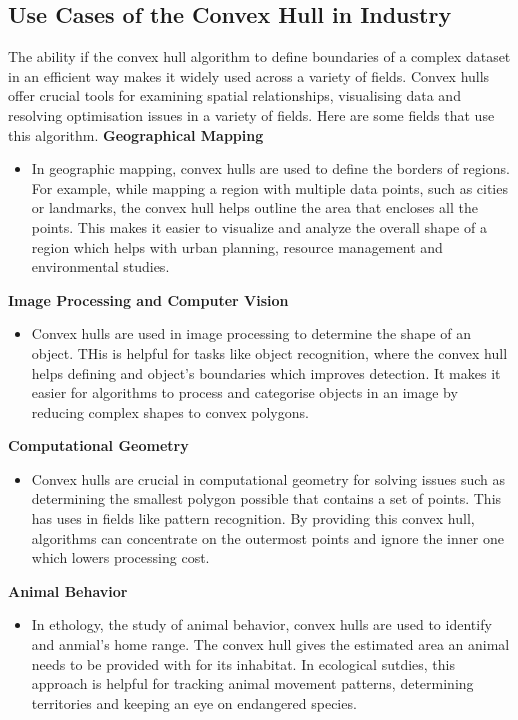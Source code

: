     \subsection{Use Cases of the Convex Hull in Industry}
    The ability if the convex hull algorithm to define boundaries of a complex dataset in an efficient way makes it widely used across a variety of fields. Convex hulls offer crucial tools for examining spatial relationships, visualising data and resolving optimisation issues in a variety of fields. Here are some fields that use this algorithm. \newline \newline
    \textbf{Geographical Mapping}
    \begin{itemize}
        \item In geographic mapping, convex hulls are used to define the borders of regions. For example, while mapping a region with multiple data points, such as cities or landmarks, the convex hull helps outline the area that encloses all the points. This makes it easier to visualize and analyze the overall shape of a region which helps with urban planning, resource management and environmental studies.
    \end{itemize}
    \textbf{Image Processing and Computer Vision}
    \begin{itemize}
        \item Convex hulls are used in image processing to determine the shape of an object. THis is helpful for tasks like object recognition, where the convex hull helps defining and object's boundaries which improves detection. It makes it easier for algorithms to process and categorise objects in an image by reducing complex shapes to convex polygons.
    \end{itemize}
    \textbf{Computational Geometry}
    \begin{itemize}
        \item Convex hulls are crucial in computational geometry for solving issues such as determining the smallest polygon possible that contains a set of points. This has uses in fields like pattern recognition. By providing this convex hull, algorithms can concentrate on the outermost points and ignore the inner one which lowers processing cost.
    \end{itemize}
    \textbf{Animal Behavior}
    \begin{itemize}
        \item In ethology, the study of animal behavior, convex hulls are used to identify and anmial's home range. The convex hull gives the estimated area an animal needs to be provided with for its inhabitat. In ecological sutdies, this approach is helpful for tracking animal movement patterns, determining territories and keeping an eye on endangered species.
    \end{itemize}
